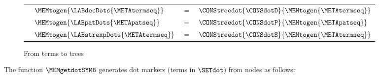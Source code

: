 \documentclass{jfp1}
\newcommand{\myfigure}{figure}
\newcommand{\sizeintables}{small}
\begin{document}
\begin{\myfigure}[!t]
\begin{\sizeintables}
\begin{tabular}{llll}
      & $\MEMtogen{\LABdecDots{\METAtermseq}}$
      & $=$
      & $\CONStreedot{\CONSdotD}{\MEMtogen{\METAtermseq}}$
      \\

      & $\MEMtogen{\LABpatDots{\METApatseq}}$
      & $=$
      & $\CONStreedot{\CONSdotP}{\MEMtogen{\METApatseq}}$
      \\

      & $\MEMtogen{\LABstrexpDots{\METAtermseq}}$
      & $=$
      & $\CONStreedot{\CONSdotS}{\MEMtogen{\METAtermseq}}$

    \end{tabular}
  \end{\sizeintables}
  \caption{From terms to trees}
  \label{fig:termstotrees}
\end{\myfigure}


The function $\MEMgetdotSYMB$ generates dot markers (terms in
$\SETdot$) from nodes as follows:
\end{document}
